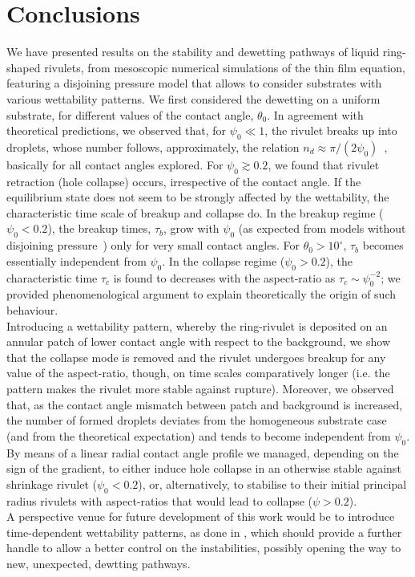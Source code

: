 \documentclass[twoside,twocolumn,9pt]{article}
\begin{document}
\section{Conclusions}\label{sec:conclu}
We have presented results on the stability and dewetting pathways of liquid ring-shaped rivulets, from mesoscopic numerical simulations of the thin film equation, featuring a disjoining pressure model that allows to consider substrates with various wettability patterns. 
We first considered the dewetting on a uniform substrate, for different values of the contact angle, $\theta_0$. In agreement with theoretical predictions, we observed that, for $\psi_0 \ll 1$, the rivulet breaks up into droplets,
whose number follows, approximately, the relation 
$n_d \approx \pi/(2\psi_0)$~\cite{gonzalezStabilityLiquidRing2013}, basically for all contact angles 
explored.
For $\psi_0 \gtrsim 0.2$, we found that rivulet retraction (hole collapse) occurs, irrespective of the contact angle. 
If the equilibrium state does not seem to be strongly affected by the wettability, the characteristic time scale of breakup and collapse do. In the breakup regime ($\psi_0 < 0.2$), the breakup times, $\tau_b$,
grow with $\psi_0$ (as expected from models without disjoining pressure~\cite{gonzalezStabilityLiquidRing2013}) only for very small contact angles. 
For $\theta_0 > 10^{\circ}$, $\tau_b$ becomes essentially independent from $\psi_0$. 
In the collapse regime ($\psi_0 > 0.2$), the characteristic time $\tau_c$ is found to decreases with 
the aspect-ratio as $\tau_c  \sim \psi_0^{-2}$; we provided phenomenological argument to explain theoretically the origin of such behaviour.\\
Introducing a wettability pattern, whereby the ring-rivulet is deposited on an annular patch of lower contact angle with respect to the background, we show that the collapse mode is removed and the rivulet undergoes breakup for any value of the aspect-ratio, though, on time scales comparatively longer (i.e. the pattern makes the rivulet more stable against rupture). Moreover, we observed that, as the contact angle mismatch between patch and background is increased, the number of formed droplets deviates from the homogeneous substrate case (and from the theoretical expectation) and tends to become independent from $\psi_0$.\\
By means of a linear radial contact angle profile we managed, depending on the sign of the gradient, to either induce hole collapse in an otherwise stable against shrinkage rivulet ($\psi_0<0.2$), or, alternatively, to stabilise to their initial principal radius rivulets with aspect-ratios that would lead to collapse ($\psi>0.2$). \\
A perspective venue for future development of this work would be to introduce time-dependent wettability patterns, as done in \cite{zitzControllingDewettingMorphologies2023}, which should provide a further handle to allow a better control on the instabilities, possibly opening the way to new, unexpected, dewtting pathways.
\end{document}
